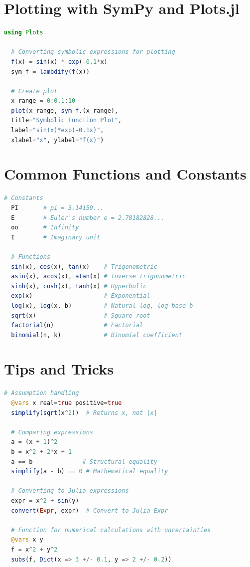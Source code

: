 \documentclass[12pt,answers]{book}
\begin{document}
\clearpage
\section{Plotting with SymPy and Plots.jl}

\begin{lstlisting}[language=Julia]
  using Plots

  # Converting symbolic expressions for plotting
  f(x) = sin(x) * exp(-0.1*x)
  sym_f = lambdify(f(x))

  # Create plot
  x_range = 0:0.1:10
  plot(x_range, sym_f.(x_range),
  title="Symbolic Function Plot",
  label="sin(x)*exp(-0.1x)",
  xlabel="x", ylabel="f(x)")
\end{lstlisting}

\section{Common Functions and Constants}

\begin{lstlisting}[language=Julia]
  # Constants
  PI       # pi = 3.14159...
  E        # Euler's number e = 2.78182828...
  oo       # Infinity
  I        # Imaginary unit

  # Functions
  sin(x), cos(x), tan(x)    # Trigonometric
  asin(x), acos(x), atan(x) # Inverse trigonometric
  sinh(x), cosh(x), tanh(x) # Hyperbolic
  exp(x)                    # Exponential
  log(x), log(x, b)         # Natural log, log base b
  sqrt(x)                   # Square root
  factorial(n)              # Factorial
  binomial(n, k)            # Binomial coefficient
\end{lstlisting}

\clearpage
\section{Tips and Tricks}

\begin{lstlisting}[language=Julia]
  # Assumption handling
  @vars x real=true positive=true
  simplify(sqrt(x^2))  # Returns x, not |x|

  # Comparing expressions
  a = (x + 1)^2
  b = x^2 + 2*x + 1
  a == b              # Structural equality
  simplify(a - b) == 0 # Mathematical equality

  # Converting to Julia expressions
  expr = x^2 + sin(y)
  convert(Expr, expr)  # Convert to Julia Expr

  # Function for numerical calculations with uncertainties
  @vars x y
  f = x^2 + y^2
  subs(f, Dict(x => 3 +/- 0.1, y => 2 +/- 0.2))
\end{lstlisting}
\end{document}
